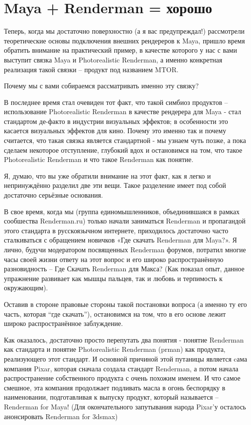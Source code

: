 \chapter*{Maya + Renderman = хорошо}
  

  Теперь, когда мы достаточно поверхностно (а я вас предупреждал!) рассмотрели теоретические основы подключения внешних рендереров к Maya, пришло время обратить
  внимание на практический пример, в качестве которого у нас с вами выступит связка Maya и Photorealistic Renderman, а именно конкретная реализация такой связки –
  продукт под названием MTOR.
  

 Почему мы с вами собираемся рассматривать именно эту связку?

В последнее время стал очевиден тот факт, что такой симбиоз продуктов – использование Photorealistic Renderman в качестве рендерера для Maya - стал стандартом де-факто
в индустрии визуальных эффектов; в особенности это касается визуальных эффектов для кино. Почему это именно так и почему считается, что такая связка является
стандартной - мы узнаем чуть позже, а пока сделаем некоторое отступление, глубокий вдох и остановимся на том, что такое Photorealistic Renderman и что такое Renderman
как понятие.
  

 Я, думаю, что вы уже обратили внимание на этот факт, как я легко и непринуждённо разделил две эти вещи. Такое разделение имеет под
    собой достаточно серьёзные основания.
  

 В свое время, когда мы (группа единомышленников, объединившаяся в рамках сообшества Renderman.ru) только начали заниматься Renderman и пропагандой этого стандарта в
русскоязычном интернете, приходилось достаточно часто сталкиваться с обращением новичков «Где скачать Renderman для Maya?». Я лично, будучи модератором посвященных
Renderman форумов, потратил многие часы своей жизни ответу на этот вопрос и его широко распространённую разновидность – Где Скачать Renderman для Макса? (Как показал
опыт, данное упражнение развивает как мышцы пальцев, так и любовь и терпимость к окружающим).

Оставив в стороне правовые стороны такой постановки вопроса (а именно ту его часть, которая “где скачать”), остановимся на том, что в его основе лежит широко
распространённое заблуждение.

Как оказалось, достаточно просто перепутать два понятия - понятие Renderman как стандарта и понятие Photorealistic Renderman (prman) как продукта, реализующего этот
стандарт. И основной причиной этой путаницы является cама компания Pixar, которая сначала создала стандарт Renderman, а потом начала распространение собственного
продукта с очень похожим именем. И что самое смешное, эта компания продолжает подливать масла в огонь беспорядку в наименовании, подготавливая к выпуску продукт,
который называется – Renderman for Maya! (Для окончательного запутывания народа Pixar’у осталось анонсировать Renderman for 3dsmax)
  

